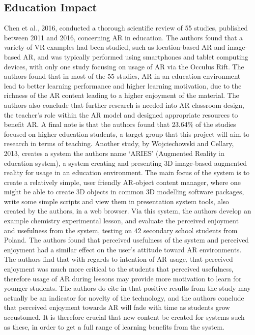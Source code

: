 \documentclass[11pt]{report}
\begin{document}
\subsection{Education Impact}
Chen et al., 2016, conducted a thorough scientific review of 55 studies, published between 2011 and 2016, concerning AR in education. The authors found that a variety of VR examples had been studied, such as location-based AR and image-based AR, and was typically performed using smartphones and tablet computing devices, with only one study focusing on usage of AR via the Occulus Rift. The authors found that in most of the 55 studies, AR in an education environment lead to better learning performance and higher learning motivation, due to the richness of the AR content leading to a higher enjoyment of the material. The authors also conclude that further research is needed into AR classroom design, the teacher's role within the AR model and designed appropriate resources to benefit AR. A final note is that the authors found that 23.64\% of the studies focused on higher education students, a target group that this project will aim to research in terms of teaching. Another study, by Wojciechowski and Cellary, 2013, creates a system the authors name `ARIES' (Augmented Reality in education system), a system creating and presenting 3D image-based augmented reality for usage in an education environment. The main focus of the system is to create a relatively simple, user friendly AR-object content manager, where one might be able to create 3D objects in common 3D modelling software packages, write some simple scripts and view them in presentation system tools, also created by the authors, in a web browser. Via this system, the authors develop an example chemistry experimental lesson, and evaluate the perceived enjoyment and usefulness from the system, testing on 42 secondary school students from Poland. The authors found that perceived usefulness of the system and perceived enjoyment had a similar effect on the user's attitude toward AR environments. The authors find that with regards to intention of AR usage, that perceived enjoyment was much more critical to the students that perceived usefulness, therefore usage of AR during lessons may provide more motivation to learn for younger students. The authors do cite in that positive results from the study may actually be an indicator for novelty of the technology, and the authors conclude that perceived enjoyment towards AR will fade with time as students grow accustomed. It is therefore crucial that new content be created for systems such as these, in order to get a full range of learning benefits from the system.
\end{document}
